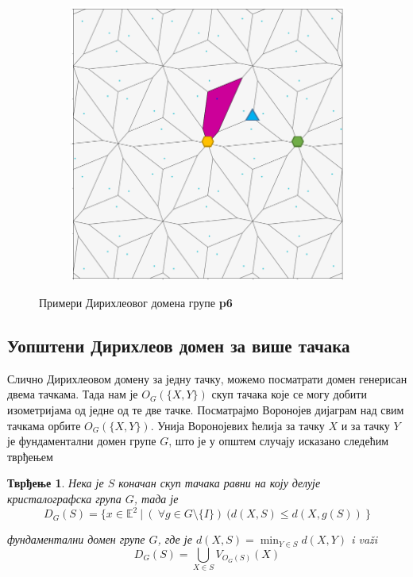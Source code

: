\documentclass[12pt]{article}
\newtheorem{tvrdjenje}{\bf Тврђење}
\begin{document}
\begin{figure}[H]
\begin{subfigure}[b]{0.32\textwidth}
    \label{fig:f2}
  \end{subfigure}
  \begin{subfigure}[b]{0.32\textwidth}
    \includegraphics[width=.9\textwidth]{dirih_2.png}
    \label{fig:f3}
  \end{subfigure}
  \caption{Примери Дирихлеовог домена групе \textbf{p6}}
\end{figure}


    \subsection{Уопштени Дирихлеов домен за више тачака}\label{konstrukcija-dirihleove-fundamentalne-oblasti}
    
Слично Дирихлеовом домену за једну тачку,  можемо посматрати домен генерисан двема тачкама. Тада нам је  $O_G(\{X,Y\})$ скуп тачака које се могу добити изометријама од једне од те две тачке. Посматрајмо Воронојев дијаграм над свим тачкама орбите $O_G(\{X,Y\})$.  Унија Воронојевих ћелија за тачку $X$ и за тачку $Y$ је фундаментални домен групе $G$, што је у општем случају исказано следећим тврђењем
\begin{tvrdjenje}
Нека је $S$ коначан скуп тачака равни на коју делује кристалографска група $G$, тада је 
$$D_G(S) = \{x \in \mathbb{E}^2\:|\:(\:\forall g \in G \setminus \{I\})\:(d(X,S)\leq d(X,g(S))\:\}$$

фундаментални домен групе $G$, где је $d(X,S) = \min_{Y \in S} d(X,Y)$ i va\v zi 
$$D_G(S) = \bigcup_{X \in S} V_{O_G(S)}(X) $$ 
\end{tvrdjenje}
\end{document}
